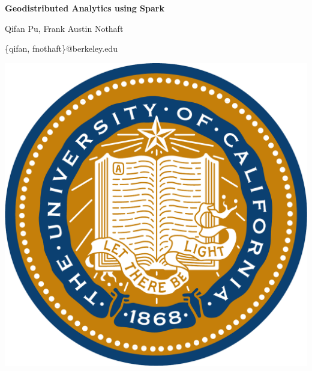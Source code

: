 \documentclass[11pt]{a0poster}
\date{}
\begin{document}
\begin{minipage}{0.887\linewidth}
\vspace{100pt}
\hspace{100pt}
\color{Blue}
{\fontsize{3cm}{1em} \bf Geodistributed Analytics using Spark}

\hspace{100pt}
\huge Qifan Pu, Frank Austin Nothaft

\hspace{100pt}
\huge \{qifan, fnothaft\}@berkeley.edu
\vspace{100pt}
\end{minipage}
\begin{minipage}{0.113\linewidth}
\includegraphics[scale=0.6]{ucseal_540_139.pdf}
\end{minipage}

{\color{Blue}\noindent\makebox[\linewidth]{\rule{\paperwidth}{30pt}}}
\end{document}
